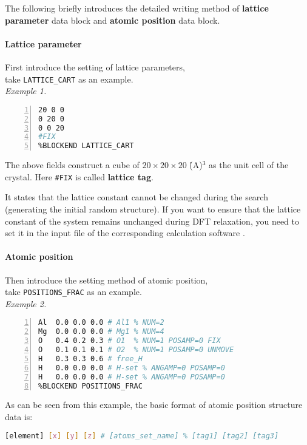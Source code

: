 \documentclass[a4paper, 10pt]{article}
\begin{document}
The following briefly introduces the detailed writing method of \textbf{lattice parameter} data block and \textbf{atomic position} data block.

\paragraph{Lattice parameter} First introduce the setting of lattice parameters, \\take \verb|LATTICE_CART| as an example.\\
\emph{Example 1.}
\begin{lstlisting}[language={bash},numbers=left]
%BLOCK LATTICE_CART
20 0 0
0 20 0
0 0 20
#FIX
%BLOCKEND LATTICE_CART
\end{lstlisting}

The above fields construct a cube of \(20\times20\times20\) \r(A)\(^3\) as the unit cell of the crystal. Here \verb|#FIX| is called \textbf{lattice tag}.

It states that the lattice constant cannot be changed during the search (generating the initial random structure). If you want to ensure that the lattice constant of the system remains unchanged during DFT relaxation, you need to set it in the input file of the corresponding calculation software .

\paragraph{Atomic position} Then introduce the setting method of atomic position, \\take \verb|POSITIONS_FRAC| as an example.\\
\emph{Example 2.}
\begin{lstlisting}[language={bash},numbers=left]
%BLOCK POSITIONS_FRAC
Al  0.0 0.0 0.0 # Al1 % NUM=2 
Mg  0.0 0.0 0.0 # Mg1 % NUM=4 
O   0.4 0.2 0.3 # O1  % NUM=1 POSAMP=0 FIX
O   0.1 0.1 0.1 # O2  % NUM=1 POSAMP=0 UNMOVE
H   0.3 0.3 0.6 # free_H 
H   0.0 0.0 0.0 # H-set % ANGAMP=0 POSAMP=0
H   0.0 0.0 0.0 # H-set % ANGAMP=0 POSAMP=0
%BLOCKEND POSITIONS_FRAC
\end{lstlisting}

As can be seen from this example, the basic format of atomic position structure data is:
\begin{lstlisting}[language={bash}]
[element] [x] [y] [z] # [atoms_set_name] % [tag1] [tag2] [tag3]
\end{lstlisting}
\end{document}
